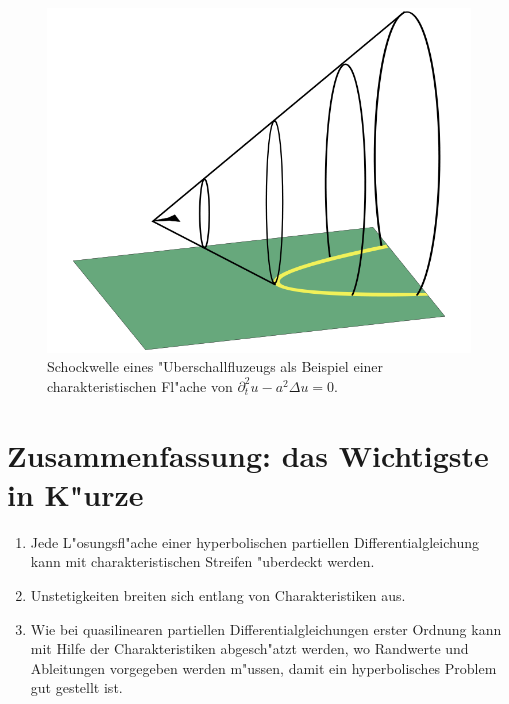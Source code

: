 \begin{figure}
\begin{center}
\includegraphics[width=0.8\hsize]{graphics/shock}
\end{center}
\caption{Schockwelle eines "Uberschallfluzeugs als Beispiel einer
charakteristischen Fl"ache von $\partial_t^2u-a^2\Delta u=0$.\label{ueberschallkegel}}
\end{figure}

\section{Zusammenfassung: das Wichtigste in K"urze}
\begin{enumerate}
\item Jede L"osungsfl"ache einer hyperbolischen partiellen Differentialgleichung
kann mit charakteristischen Streifen "uberdeckt werden.
\item Unstetigkeiten breiten sich entlang von Charakteristiken aus.
\item Wie bei quasilinearen partiellen Differentialgleichungen erster
Ordnung kann mit Hilfe der Charakteristiken abgesch"atzt werden, wo
Randwerte und Ableitungen vorgegeben werden m"ussen, damit ein hyperbolisches
Problem gut gestellt ist.
\end{enumerate}

